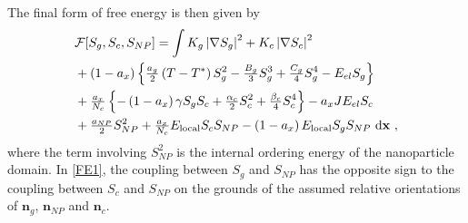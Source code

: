 \documentclass[reprint,amsfonts,amsmath,amssymb,aps,pre,floatfix,10pt]{revtex4-1}
\newcommand\dd{\mathrm{d}}
\newcommand\x{\mathbf{x}}
\newcommand\n{\mathbf{n}}
\newcommand\Q{\mathbf{Q}}
\begin{document}
The final form of free energy is then given by
\begin{equation}\label{FE1}
\begin{aligned} 
& \mathcal{F}[S_g, S_c, S_{NP}]= \int K_g\left|\nabla S_g\right|^2 +K_c\left|\nabla S_c\right|^2 \\
 & +\left(1-a_x\right)\Bigl\{\tfrac{a_g}{2}\left(T-T^*\right) S_g^2-\tfrac{B_g}{3} S_g^3+\tfrac{C_g}{4} S_g^4-E_{e l} S_g\Bigr\} \\ &+ \tfrac{a_x}{N_c}\left\{-\left(1-a_x\right) \gamma S_g S_c+\tfrac{\alpha_c}{2} S_c^2+\tfrac{\beta_c}{4} S_c^4\right\}-a_x J E_{e l} S_c \\
& +\tfrac{a_{N P}}{2} S_{N P}^2 + \tfrac{a_x}{N_c} E_{\rm  local} S_c S_{NP}-\left(1-a_x\right) E_{\rm local} S_g S_{NP} ~ \dd \x  \ , \end{aligned}
\end{equation}
where the term involving $S_{NP}^2$ is the internal ordering energy of the nanoparticle domain. In \eqref{FE1}, the coupling between $S_g$ and $S_{NP}$ has the opposite sign to the coupling between $S_c$ and $S_{NP}$ on the grounds of the assumed relative orientations of $\n_g$, $\n_{NP}$ and $\n_c$.
\end{document}
